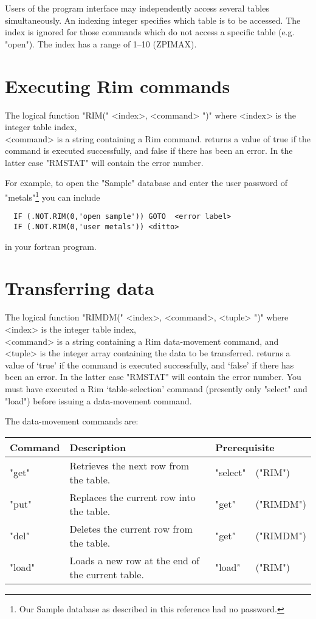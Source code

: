 Users of the program interface may independently access several
tables simultaneously.  An indexing integer specifies which
table is to be accessed.
The index is ignored for
those commands which do not access
a specific table (e.g. "open").
The index has a range of 1--10 (ZPIMAX).
 
 
\section{Executing Rim commands}
%
The logical function
\<"RIM(" <index>, <command> ")"\>
where
\<<index> is the integer table index,\\
       <command> is a string containing a Rim command.\>
returns a value of true if the command is executed successfully,
and false if there has been an error.  In the latter case
"RMSTAT" will contain the error number.
 
For example, to open the "Sample" database and enter the
user password of "metals"\footnote{Our Sample database
as described in this reference had no password.}
you can include
 
\code\begin{verbatim}
  IF (.NOT.RIM(0,'open sample')) GOTO  <error label>
  IF (.NOT.RIM(0,'user metals')) <ditto>
\end{verbatim}\endcode
 
in your fortran program.
 
\section{Transferring data}
%
The logical function
\<"RIMDM(" <index>, <command>, <tuple> ")"\>
where
\<<index> is the integer table index,\\
       <command> is a string containing a Rim data-movement command, and\\
       <tuple> is the integer array containing the data to be transferred.\>
returns a value of `true' if the command is executed successfully,
and `false' if there has been an error.  In the latter case
"RMSTAT" will contain the error number.
You must have executed a Rim `table-selection' command
(presently only "select" and "load")
before issuing a data-movement command.
 
The data-movement commands are:
 
\medskip
\begin{tabular}{lp{12pc}ll}
Command&
Description&
\multicolumn{2}{l}{Prerequisite}\\
\hline
"get"& Retrieves the next row from the table.& "select"&("RIM")\\
"put"& Replaces the current row into the table.& "get"&("RIMDM")\\
"del"& Deletes the current row from the table.& "get"&("RIMDM")\\
"load"& Loads a new row at the end of the current table.&
                "load"&("RIM")
\end{tabular}
 
